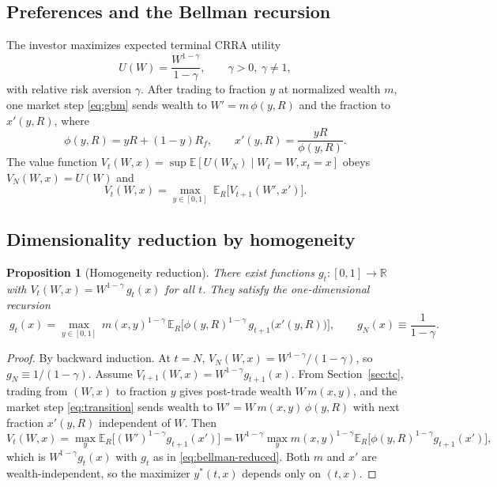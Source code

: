 \documentclass[11pt]{article}
\newtheorem{proposition}{Proposition}
\newcommand{\E}{\mathbb{E}}
\newcommand{\R}{\mathbb{R}}
\begin{document}
\subsection{Preferences and the Bellman recursion}
The investor maximizes expected terminal CRRA utility
\begin{equation}
U(W)=\frac{W^{1-\gamma}}{1-\gamma},\qquad \gamma>0,\ \gamma\ne 1,
\end{equation}
with relative risk aversion $\gamma$. After trading to fraction $y$ at
normalized wealth $m$, one market step \eqref{eq:gbm} sends wealth to
$W'=m\,\phi(y,R)$ and the fraction to $x'(y,R)$, where
\begin{equation}
\phi(y,R)=yR+(1-y)R_f,\qquad x'(y,R)=\frac{yR}{\phi(y,R)} .
\label{eq:transition}
\end{equation}
The value function $V_t(W,x)=\sup\E[U(W_N)\mid W_t=W,x_t=x]$ obeys
$V_N(W,x)=U(W)$ and
\begin{equation}
V_t(W,x)=\max_{y\in[0,1]}\ \E_R\!\big[V_{t+1}(W',x')\big].
\label{eq:bellman-full}
\end{equation}

\subsection{Dimensionality reduction by homogeneity}
\begin{proposition}[Homogeneity reduction]
\label{prop:homog}
There exist functions $g_t:[0,1]\to\R$ with
$V_t(W,x)=W^{1-\gamma}\,g_t(x)$ for all $t$. They satisfy the one-dimensional
recursion
\begin{equation}
\boxed{\;
g_t(x)=\max_{y\in[0,1]}\ m(x,y)^{1-\gamma}\,
\E_R\!\big[\phi(y,R)^{1-\gamma}\,g_{t+1}\!\big(x'(y,R)\big)\big],
\qquad g_N(x)\equiv\frac{1}{1-\gamma}. \;}
\label{eq:bellman-reduced}
\end{equation}
\end{proposition}

\begin{proof}
By backward induction. At $t=N$, $V_N(W,x)=W^{1-\gamma}/(1-\gamma)$, so
$g_N\equiv 1/(1-\gamma)$. Assume $V_{t+1}(W,x)=W^{1-\gamma}g_{t+1}(x)$. From
Section~\ref{sec:tc}, trading from $(W,x)$ to fraction $y$ gives post-trade
wealth $W\,m(x,y)$, and the market step \eqref{eq:transition} sends wealth to
$W'=W\,m(x,y)\,\phi(y,R)$ with next fraction $x'(y,R)$ independent of $W$.
Then
\[
V_t(W,x)=\max_y\E_R\!\big[(W')^{1-\gamma}g_{t+1}(x')\big]
=W^{1-\gamma}\max_y m(x,y)^{1-\gamma}
\E_R\!\big[\phi(y,R)^{1-\gamma}g_{t+1}(x')\big],
\]
which is $W^{1-\gamma}g_t(x)$ with $g_t$ as in
\eqref{eq:bellman-reduced}. Both $m$ and $x'$ are wealth-independent, so the
maximizer $y^{*}(t,x)$ depends only on $(t,x)$.
\end{proof}
\end{document}
